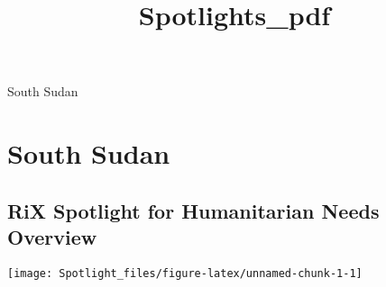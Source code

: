 \documentclass[
]{article}
\title{Spotlights\_pdf}
\author{}
\date{\vspace{-2.5em}}
\begin{document}
\maketitle

South Sudan

\hypertarget{south-sudan}{%
\section{South Sudan}\label{south-sudan}}

\hypertarget{rix-spotlight-for-humanitarian-needs-overview}{%
\subsection{RiX Spotlight for Humanitarian Needs
Overview}\label{rix-spotlight-for-humanitarian-needs-overview}}

\texttt{[image: Spotlight\_files/figure-latex/unnamed-chunk-1-1]}
\end{document}

